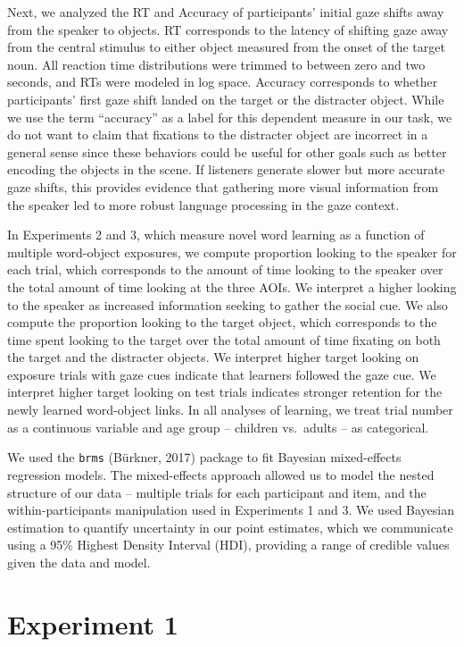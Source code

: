 \documentclass[oneside]{report}
\begin{document}
Next, we analyzed the RT and Accuracy of participants' initial gaze
shifts away from the speaker to objects. RT corresponds to the latency
of shifting gaze away from the central stimulus to either object
measured from the onset of the target noun. All reaction time
distributions were trimmed to between zero and two seconds, and RTs were
modeled in log space. Accuracy corresponds to whether participants'
first gaze shift landed on the target or the distracter object. While we
use the term ``accuracy'' as a label for this dependent measure in our
task, we do not want to claim that fixations to the distracter object
are incorrect in a general sense since these behaviors could be useful
for other goals such as better encoding the objects in the scene. If
listeners generate slower but more accurate gaze shifts, this provides
evidence that gathering more visual information from the speaker led to
more robust language processing in the gaze context.

In Experiments 2 and 3, which measure novel word learning as a function
of multiple word-object exposures, we compute proportion looking to the
speaker for each trial, which corresponds to the amount of time looking
to the speaker over the total amount of time looking at the three AOIs.
We interpret a higher looking to the speaker as increased information
seeking to gather the social cue. We also compute the proportion looking
to the target object, which corresponds to the time spent looking to the
target over the total amount of time fixating on both the target and the
distracter objects. We interpret higher target looking on exposure
trials with gaze cues indicate that learners followed the gaze cue. We
interpret higher target looking on test trials indicates stronger
retention for the newly learned word-object links. In all analyses of
learning, we treat trial number as a continuous variable and age group
-- children vs.~adults -- as categorical.

We used the \texttt{brms} (Bürkner, 2017) package to fit Bayesian
mixed-effects regression models. The mixed-effects approach allowed us
to model the nested structure of our data -- multiple trials for each
participant and item, and the within-participants manipulation used in
Experiments 1 and 3. We used Bayesian estimation to quantify uncertainty
in our point estimates, which we communicate using a 95\% Highest
Density Interval (HDI), providing a range of credible values given the
data and model.

\section{Experiment 1}\label{experiment-1-2}
\end{document}
